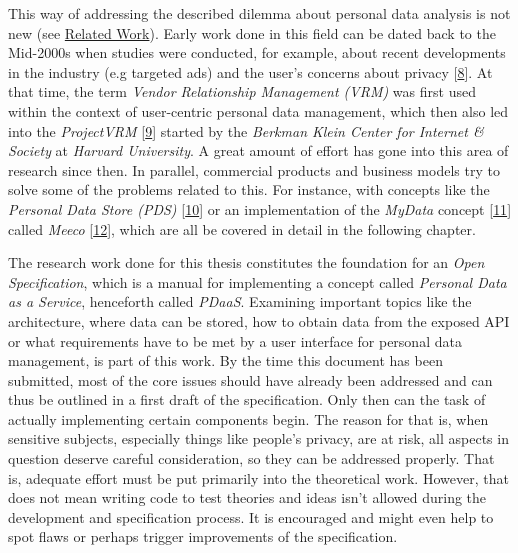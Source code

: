 \documentclass[12pt,english,a4paper,titlepage,cleardoublepage=empty,dottedtoc]{report}
\begin{document}
This way of addressing the described dilemma about personal data
analysis is not new (see \protect\hyperlink{related-work}{Related
Work}). Early work done in this field can be dated back to the Mid-2000s
when studies were conducted, for example, about recent developments in
the industry (e.g targeted ads) and the user's concerns about privacy
{[}\protect\hyperlink{ref-study_2004_architecture-for-privacy-sensitive-ubiquitous-computing}{8}{]}.
At that time, the term \emph{Vendor Relationship Management (VRM)} was
first used within the context of user-centric personal data management,
which then also led into the \emph{ProjectVRM}
{[}\protect\hyperlink{ref-web_2010_projectvrm_about}{9}{]} started by
the \emph{Berkman Klein Center for Internet \& Society} at \emph{Harvard
University}. A great amount of effort has gone into this area of
research since then. In parallel, commercial products and business
models try to solve some of the problems related to this. For instance,
with concepts like the \emph{Personal Data Store (PDS)}
{[}\protect\hyperlink{ref-paper_2013_the-personal-data-store-approach-to-personal-data-security_2013}{10}{]}
or an implementation of the \emph{MyData} concept
{[}\protect\hyperlink{ref-whitepaper_2014_mydata-a-nordic-model-for-human-centered-personal-data-management-and-processing}{11}{]}
called \emph{Meeco}
{[}\protect\hyperlink{ref-web_2016_meeco-how-it-works}{12}{]}, which are
all be covered in detail in the following chapter.

The research work done for this thesis constitutes the foundation for an
\emph{Open Specification}, which is a manual for implementing a concept
called \emph{Personal Data as a Service}, henceforth called
\emph{PDaaS}. Examining important topics like the architecture, where
data can be stored, how to obtain data from the exposed API or what
requirements have to be met by a user interface for personal data
management, is part of this work. By the time this document has been
submitted, most of the core issues should have already been addressed
and can thus be outlined in a first draft of the specification. Only
then can the task of actually implementing certain components begin. The
reason for that is, when sensitive subjects, especially things like
people's privacy, are at risk, all aspects in question deserve careful
consideration, so they can be addressed properly. That is, adequate
effort must be put primarily into the theoretical work. However, that
does not mean writing code to test theories and ideas isn't allowed
during the development and specification process. It is encouraged and
might even help to spot flaws or perhaps trigger improvements of the
specification.
\end{document}
